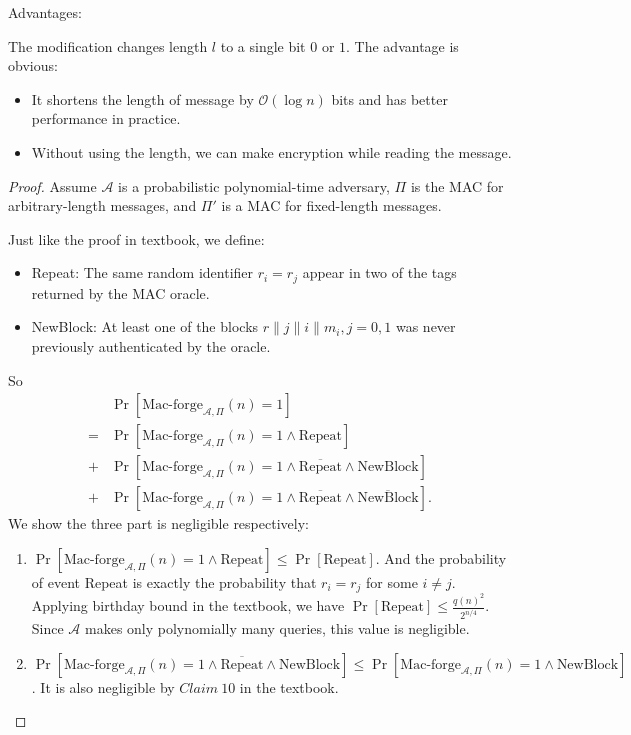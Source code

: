 \documentclass[12pt]{article}
\newcommand{\Repeat}{\text{Repeat}}
\newcommand{\Newblock}{\text{NewBlock}}
\newcommand{\A}{\mathcal{A}}
\newenvironment{problem}[2][Problem]{\begin{trivlist}
\item[\hskip \labelsep {\bfseries #1}\hskip \labelsep {\bfseries #2.}]}{\end{trivlist}}
\begin{document}
\begin{problem}{4.12}
Advantages: \par
The modification changes length $l$ to a single bit $0$ or $1$. The advantage is obvious: \begin{itemize}
    \item It shortens the length of message by $\mathcal{O}(\log n)$ bits and has better performance in practice.
    \item Without using the length, we can make encryption while reading the message.
\end{itemize}\par 
\vspace{2ex}
\begin{proof}
Assume $\A$ is a probabilistic polynomial-time adversary, $\Pi$ is the MAC for arbitrary-length messages, and $\Pi'$ is a MAC for fixed-length messages.\par
Just like the proof in textbook, we define:
\begin{itemize}
    \item Repeat: The same random identifier $r_i=r_j$ appear in two of
the tags returned by the MAC oracle.
    \item NewBlock:  At least one of the blocks $r\|j\|i\|m_i,j=0,1$ was never previously authenticated by the oracle.
\end{itemize}
So 
\begin{align*}
    &\Pr[\text{Mac-forge}_{\A,\Pi}(n)=1]\\
    =&\Pr[\text{Mac-forge}_{\A,\Pi}(n)=1\land\Repeat]\\
    +&\Pr[\text{Mac-forge}_{\A,\Pi}(n)=1\land\overline{\Repeat}\land\Newblock]\\
    +&\Pr[\text{Mac-forge}_{\A,\Pi}(n)=1\land\overline{\Repeat}\land\overline{\Newblock}].
\end{align*}
We show the three part is negligible respectively:
\begin{enumerate}
    \item $\Pr[\text{Mac-forge}_{\A,\Pi}(n)=1\land\Repeat]\le\Pr[\Repeat]$. And the probability of event Repeat is exactly the probability that $r_i=r_j$ for some $i\ne j$. Applying birthday bound in the textbook, we have $\Pr[\Repeat]\le\frac{q(n)^2}{2^{n/4}}$. Since $\A$ makes only polynomially many queries, this value is negligible.
    \item $\Pr[\text{Mac-forge}_{\A,\Pi}(n)=1\land\overline{\Repeat}\land\Newblock]\le \Pr[\text{Mac-forge}_{\A,\Pi}(n)=1\land\Newblock]$. It is also negligible by $Claim\ 10$ in the textbook.

\end{enumerate}
\end{proof}
\end{problem}
\end{document}
